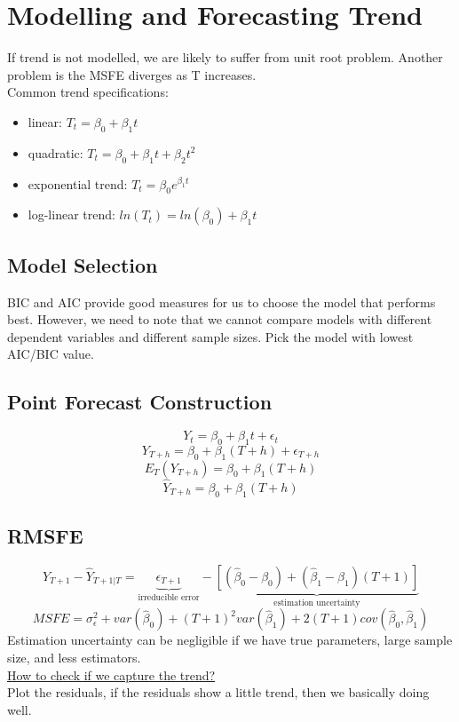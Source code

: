 \documentclass{article}
\begin{document}
\section{Modelling and Forecasting Trend}
If trend is not modelled, we are likely to suffer from unit root problem. Another problem is the MSFE diverges as T increases.\\
Common trend specifications:
\begin{itemize}
    \item linear: $T_t = \beta_0 + \beta_1 t$
    \item quadratic: $T_t = \beta_0 + \beta_1 t + \beta_2 t^2$
    \item exponential trend: $T_t = \beta_0 e^{\beta_1 t}$
    \item log-linear trend: $ln(T_t) = ln(\beta_0) + \beta_1 t$
\end{itemize}

\subsection{Model Selection}
BIC and AIC provide good measures for us to choose the model that performs best. However, we need to note that we cannot compare models with different dependent variables and different sample sizes. Pick the model with lowest AIC/BIC value.

\subsection{Point Forecast Construction}
$$Y_t = \beta_0 + \beta_1 t + \epsilon_t$$
$$Y_{T+h} = \beta_0 + \beta_1(T+h) + \epsilon_{T+h}$$
$$E_T(Y_{T+h}) = \beta_0 + \beta_1(T+h)$$
$$\hat{Y}_{T+h} = \beta_0 + \beta_1(T+h)$$

\subsection{RMSFE}
$$Y_{T+1} - \hat{Y}_{T+1|T} = \underbrace{\epsilon_{T+1}}_{\text{irreducible error}} - \underbrace{[(\hat{\beta}_0 - \beta_0) + (\hat{\beta}_1 - \beta_1)(T+1)]}_{\text{estimation uncertainty}}$$
$$MSFE = \sigma_\epsilon^2 + var(\hat{\beta}_0) + (T+1)^2 var(\hat{\beta}_1) + 2(T+1)cov(\hat{\beta}_0, \hat{\beta}_1)$$
Estimation uncertainty can be negligible if we have true parameters, large sample size, and less estimators.\\
\small{\underline{How to check if we capture the trend?}\\
Plot the residuals, if the residuals show a little trend, then we basically doing well.}
\end{document}
